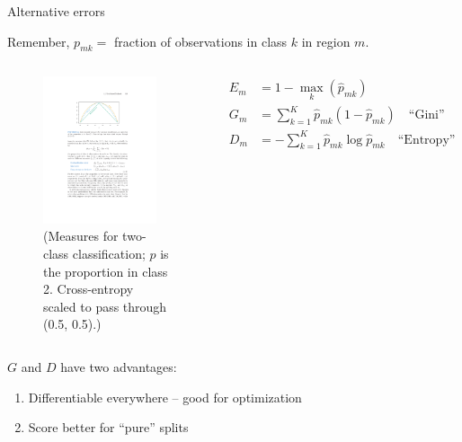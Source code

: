 \documentclass[mathserif, aspectratio=169]{beamer}
\begin{document}
\begin{frame}{Alternative errors}

Remember, $p_{mk} =$  fraction of observations in class $k$ in region $m$.

\begin{columns}
\begin{figure}
\includegraphics[width=0.9\textwidth]{E_vs_G_vs_D}
\vspace*{-3mm}
\caption*{\scriptsize (Measures for two-class classification; $p$ is the proportion in class 2. Cross-entropy scaled to pass through (0.5, 0.5).)}
\end{figure}
\begin{align*}
E_m &= 1- \max_k (\hat{p}_{mk})\\
G_m &= \sum_{k=1}^K \hat{p}_{mk}(1-\hat{p}_{mk})\quad\text{``Gini''}\\
D_m &= -\sum_{k=1}^K \hat{p}_{mk}\log{ \hat{p}_{mk}}\quad\text{``Entropy''}
\end{align*}
\end{columns}
\vspace{-0mm}
$G$ and $D$ have two advantages:
\begin{enumerate}
\item Differentiable everywhere -- good for optimization
\item Score better for ``pure'' splits
\end{enumerate}
\end{frame}
\end{document}
